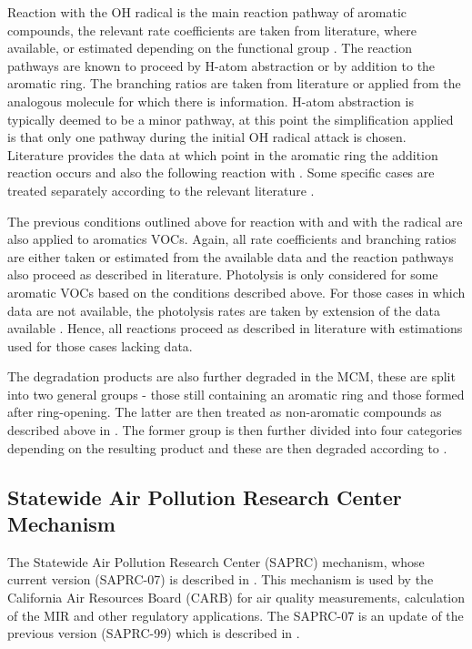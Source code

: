 Reaction with the OH radical is the main reaction pathway of aromatic compounds, the relevant rate coefficients are taken from 
literature, where available, or estimated depending on the functional group \citep{Jenkin:2003}. The reaction pathways are known
to proceed by H-atom abstraction or by addition to the aromatic ring. The branching ratios are taken from literature or applied
from the analogous molecule for which there is information. H-atom abstraction is typically deemed to be a minor pathway, at 
this point the simplification applied is that only one pathway during the initial OH radical attack is chosen. Literature 
provides the data at which point in the aromatic ring the addition reaction occurs and also the following reaction with 
. Some specific cases are treated separately according to the relevant literature \citep{Jenkin:2003}.

The previous conditions outlined above for reaction with  and with the  radical are also applied to aromatics 
VOCs. Again, all rate coefficients and branching ratios are either taken or estimated from the available data and the reaction 
pathways also proceed as described in literature. Photolysis is only considered for some aromatic VOCs based on the conditions 
described above. For those cases in which data are not available, the photolysis rates are taken by extension of the data 
available \citep{Jenkin:2003}. Hence, all reactions proceed as described in literature with estimations used for those cases 
lacking data.

The degradation products are also further degraded in the MCM, these are split into two general groups - those still containing
an aromatic ring and those formed after ring-opening. The latter are then treated as non-aromatic compounds as described above 
in \citep{Saunders:2003}. The former group is then further divided into four categories depending on the resulting product and 
these are then degraded according to \citep{Jenkin:2003}.

\subsection{Statewide Air Pollution Research Center Mechanism}
The Statewide Air Pollution Research Center (SAPRC) mechanism, whose current version (SAPRC-07) is described in 
\citep{Carter:2010}. This mechanism is used by the California Air Resources Board (CARB) for air quality measurements, 
calculation of the MIR and other regulatory applications.  The SAPRC-07 is an update of the previous version (SAPRC-99) which 
is described in \citep{Carter:2000}. 

